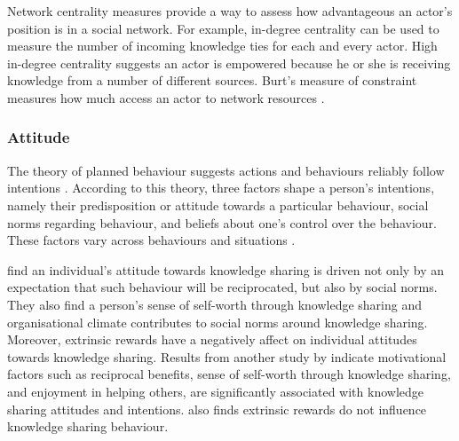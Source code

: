 Network centrality measures provide a way to assess how advantageous an actor's position is in a social network. For example, in-degree centrality can be used to measure the number of incoming knowledge ties for each and every actor. High in-degree centrality suggests an actor is empowered because he or she is receiving knowledge from a number of different sources. Burt's measure of constraint measures how much access an actor to network resources \citep{burt1987social}. 



\medskip



\subsubsection{Attitude}

The theory of planned behaviour suggests actions and behaviours reliably follow intentions \citep{ajzen1985intentions}. According to this theory, three factors shape a person's intentions, namely their predisposition or attitude towards a particular behaviour, social norms regarding behaviour, and beliefs about one's control over the behaviour. These factors vary across behaviours and situations \citep{ajzen1991theory}. \medskip

\citet{bock2005behavioral} find an individual's attitude towards knowledge sharing is driven not only by an expectation that such behaviour will be reciprocated, but also by social norms. They also find a person's sense of self-worth through knowledge sharing and organisational climate contributes to social norms around knowledge sharing. Moreover, extrinsic rewards have a negatively affect on individual attitudes towards knowledge sharing. Results from another study by \citet{lin2007effects} indicate motivational factors such as reciprocal benefits, sense of self-worth through knowledge sharing, and enjoyment in helping others, are significantly associated with knowledge sharing attitudes and intentions. \citet{lin2007effects} also finds extrinsic rewards do not influence knowledge sharing behaviour. \medskip

